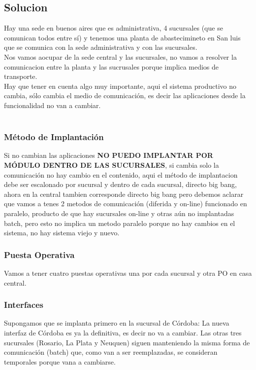 \documentclass[12pt]{book}
\begin{document}
\subsection{Solucion} 
Hay una sede en buenos aires que es administrativa, 4 sucursales (que se comunican todos entre sí) y tenemos una planta de abastecimineto en San luis que se comunica con la sede administrativa y con las sucursales.
\\
Nos vamos aocupar de la sede central y las sucursales, no vamos a resolver la comunicacion entre la planta y las sucrusales porque implica medios de transporte.
\\
Hay que tener en cuenta algo muy importante, aqui el sistema productivo no cambia, sólo cambia el medio de comunicación, es decir las aplicaciones desde la funcionalidad no van a cambiar. \\ \\

\subsubsection{Método de Implantación}
Si no cambian las aplicaciones \textbf{NO PUEDO IMPLANTAR POR MÓDULO DENTRO DE LAS SUCURSALES}, si cambia solo la comunicación no hay cambio en el contenido, aqui el método de implantacion debe ser escalonado por sucursal y dentro de cada sucursal, directo big bang, ahora en la central tambien corresponde directo big bang pero debemos aclarar que vamos a tenes 2 metodos de comunicación (diferida y on-line) funcionado en paralelo, producto de que hay sucursales on-line y otras aún no implantadas batch, pero esto no implica un metodo paralelo porque no hay cambios en el sistema, no hay sistema viejo y nuevo.

\subsubsection{Puesta Operativa}
Vamos a tener cuatro puestas operativas una por cada sucursal y otra PO en casa central.

\subsubsection{Interfaces}
Supongamos que se implanta primero en la sucursal de Córdoba:
La nueva interfaz de Córdoba es ya la definitiva, es decir no va a cambiar.
Las otras tres sucursales (Rosario, La Plata y Neuquen) siguen manteniendo la misma forma de comunicación (batch) que, como van a ser reemplazadas, se consideran temporales porque vana a cambiarse.
\end{document}
